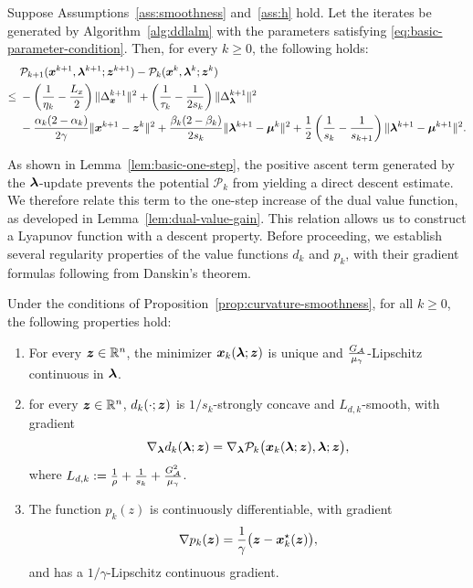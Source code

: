 \begin{lemma}
\label{lem:basic-one-step}
Suppose Assumptions~\ref{ass:smoothness} and~\ref{ass:h} hold.
Let the iterates be generated by Algorithm~\ref{alg:ddlalm} with the
parameters satisfying \eqref{eq:basic-parameter-condition}.  Then, for
every $k\ge0$, the following holds:
\begin{equation}
\label{eq:basic-one-step}
\begin{aligned}
    &\mathcal P_{k+1}(\bm{x}^{k+1},\bm{\lambda}^{k+1};\bm{z}^{k+1})
    -\mathcal P_k(\bm{x}^k,\bm{\lambda}^k;\bm{z}^k) \\
    \le\;&
    -\left(\frac{1}{\eta_k}-\frac{L_x}{2}\right)
      \|\Delta_{\bm{x}}^{k+1}\|^2
    +\left(\frac{1}{\tau_k}-\frac{1}{2s_k}\right)
      \|\Delta_{\bm{\lambda}}^{k+1}\|^2 \\
    &-\frac{\alpha_k(2-\alpha_k)}{2\gamma}
      \|\bm{x}^{k+1}-\bm{z}^k\|^2
    +\frac{\beta_k(2-\beta_k)}{2s_k}
      \|\bm{\lambda}^{k+1}-\bm{\mu}^k\|^2 +\frac{1}{2}
      \left(\frac{1}{s_k}-\frac{1}{s_{k+1}}\right)
      \|\bm{\lambda}^{k+1}-\bm{\mu}^{k+1}\|^2 .
\end{aligned}
\end{equation}
\end{lemma}


As shown in Lemma~\ref{lem:basic-one-step}, the positive ascent term
generated by the $\bm{\lambda}$-update prevents the potential
$\mathcal P_k$ from yielding a direct descent estimate. We therefore relate
this term to the one-step increase of the dual value function, as developed
in Lemma~\ref{lem:dual-value-gain}.  This relation allows us to construct a Lyapunov function with a descent property. Before proceeding, we establish several regularity properties of the value functions \(d_k\) and \(p_k\), with their gradient formulas following from Danskin's theorem.
\begin{lemma}
\label{lem:v2-value-regularity}
Under the conditions of Proposition~\ref{prop:curvature-smoothness}, for all $k\ge0$, the following properties hold:
\begin{enumerate}[label=(\roman*)]
\item
For every \(\bm{z} \in \mathbb{R}^n \), the minimizer
\(\bm{x}_k(\bm{\lambda};\bm{z})\) is unique and
\(\frac{G_{\cal A}}{\mu_\gamma}\)-Lipschitz continuous in
\(\bm{\lambda}\).

\item for every \(\bm{z}\in\mathbb{R}^n\),
\(d_k(\cdot;\bm{z})\) is \(1/s_k\)-strongly concave and
\(L_{d,k}\)-smooth, with gradient
\[
    \nabla_{\bm{\lambda}}d_k(\bm{\lambda};\bm{z})
    =
    \nabla_{\bm{\lambda}}\mathcal P_k
    \bigl(\bm{x}_k(\bm{\lambda};\bm{z}),\bm{\lambda};\bm{z}\bigr),
\]
where \(L_{d,k}:=\frac1\rho+\frac1{s_k}+\frac{G_{\cal A}^2}{\mu_\gamma}\).

\item
The function \(p_k(z)\) is continuously differentiable, with gradient
\[
    \nabla p_k(\bm{z})
    =
    \frac1\gamma
    \bigl(\bm{z}-\bm{x}_k^\star(\bm{z})\bigr),
\]
and has a \(1/\gamma\)-Lipschitz continuous gradient.
\end{enumerate}
\end{lemma}

